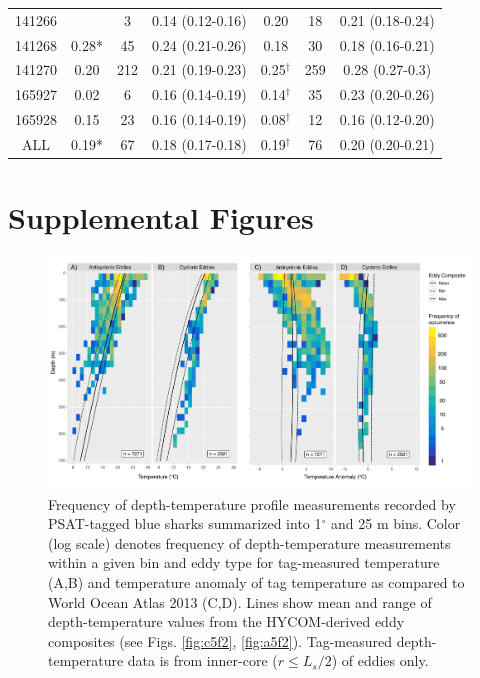 \begin{table}
\begin{tabular}[t]{ccccccc}
141266 &  & 3 & 0.14 (0.12-0.16) & 0.20 & 18 & 0.21 (0.18-0.24)\\
141268 & 0.28* & 45 & 0.24 (0.21-0.26) & 0.18 & 30 & 0.18 (0.16-0.21)\\
141270 & 0.20 & 212 & 0.21 (0.19-0.23) & 0.25$^{\dagger}$ & 259 & 0.28 (0.27-0.3)\\
165927 & 0.02 & 6 & 0.16 (0.14-0.19) & 0.14$^{\dagger}$ & 35 & 0.23 (0.20-0.26)\\
165928 & 0.15 & 23 & 0.16 (0.14-0.19) & 0.08$^{\dagger}$ & 12 & 0.16 (0.12-0.20)\\
ALL & 0.19* & 67 & 0.18 (0.17-0.18) & 0.19$^{\dagger}$ & 76 & 0.20 (0.20-0.21)\\
\bottomrule
\end{tabular}
\end{table}

\clearpage


\section{Supplemental Figures}

\begin{figure}[htbp]
\centering
\includegraphics[width=\textwidth]{images/A5_Fig1.pdf}
\caption[Frequency of depth-temperature profile measurements recorded by PSAT-tagged blue sharks]{Frequency of depth-temperature profile measurements recorded by PSAT-tagged blue sharks summarized into 1$^\circ$ and 25 m bins. Color (log scale) denotes frequency of depth-temperature measurements within a given bin and eddy type for tag-measured temperature (A,B) and temperature anomaly of tag temperature as compared to World Ocean Atlas 2013 (C,D). Lines show mean and range of depth-temperature values from the HYCOM-derived eddy composites (see Figs. \ref{fig:c5f2}, \ref{fig:a5f2}). Tag-measured depth-temperature data is from inner-core ($r \leq L_s/2$) of eddies only.}
\label{fig:a5f1} %
\end{figure}

